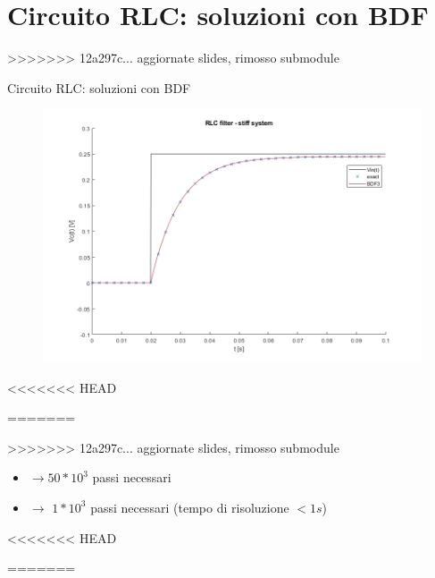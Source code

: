 \documentclass[aspectratio=169, 10pt, handout,usenames,dvipsnames]{beamer}
\begin{document}
\section{Circuito RLC: soluzioni con BDF}\label{sec:sec12}
>>>>>>> 12a297c... aggiornate slides, rimosso submodule

 \begin{frame}{Circuito RLC: soluzioni con BDF}
    \begin{figure}
        \centering
        \includegraphics[width=.68\linewidth]{rlc_solution_comparison.png}
        \label{fig:rlc_bdf_solution}
    \end{figure}
<<<<<<< HEAD

=======

>>>>>>> 12a297c... aggiornate slides, rimosso submodule
    \begin{itemize}
        \item{ $\rightarrow 50*10^3$ passi necessari}
        \item{ $\rightarrow$ \space $1*10^3$ passi necessari (tempo di risoluzione $<1s$)}
    \end{itemize}
 \end{frame}
<<<<<<< HEAD


=======
\end{document}
